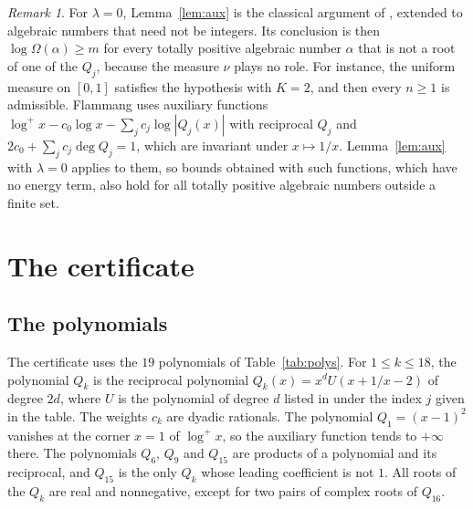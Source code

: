 \documentclass[11pt]{amsart}
\theoremstyle{remark}
\newtheorem{remark}[theorem]{Remark}
\numberwithin{equation}{section}
\newcommand{\logp}{\log^{+}}
\newcommand{\NPoly}{19}
\begin{document}
\begin{remark}\label{rem:flammang}
For $\lambda=0$, Lemma~\ref{lem:aux} is the classical argument of \cite{Smy81}, extended to algebraic numbers that need not be integers. Its conclusion is then $\log\Omega(\alpha)\ge m$ for every totally positive algebraic number $\alpha$ that is not a root of one of the $Q_j$, because the measure $\nu$ plays no role. For instance, the uniform measure on $[0,1]$ satisfies the hypothesis with $K=2$, and then every $n\ge1$ is admissible. Flammang \cite[Section~2.1]{Fla15} uses auxiliary functions $\logp x-c_0\log x-\sum_jc_j\log|Q_j(x)|$ with reciprocal $Q_j$ and $2c_0+\sum_jc_j\deg Q_j=1$, which are invariant under $x\mapsto1/x$. Lemma~\ref{lem:aux} with $\lambda=0$ applies to them, so bounds obtained with such functions, which have no energy term, also hold for all totally positive algebraic numbers outside a finite set.
\end{remark}

\section{The certificate}\label{sec:cert}

\subsection{The polynomials}
The certificate uses the $\NPoly$ polynomials of Table~\ref{tab:polys}. For $1\le k\le18$, the polynomial $Q_k$ is the reciprocal polynomial $Q_k(x)=x^{d}U(x+1/x-2)$ of degree $2d$, where $U$ is the polynomial of degree $d$ listed in \cite[Table~1]{Fla15} under the index $j$ given in the table. The weights $c_k$ are dyadic rationals. The polynomial $Q_1=(x-1)^2$ vanishes at the corner $x=1$ of $\logp x$, so the auxiliary function tends to $+\infty$ there. The polynomials $Q_6$, $Q_9$ and $Q_{15}$ are products of a polynomial and its reciprocal, and $Q_{15}$ is the only $Q_k$ whose leading coefficient is not $1$. All roots of the $Q_k$ are real and nonnegative, except for two pairs of complex roots of $Q_{16}$.
\end{document}
